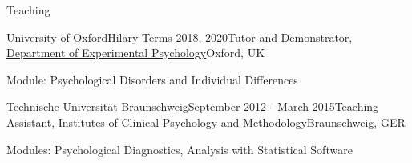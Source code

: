 \documentclass{resume} %
\begin{document}


\begin{rSection}{Teaching}

\begin{rSubsection}{University of Oxford}{Hilary Terms 2018, 2020}{Tutor and Demonstrator, \href{https://www.psy.ox.ac.uk/}{Department of Experimental Psychology}}{Oxford, UK}
  \item Module: Psychological Disorders and Individual Differences
\end{rSubsection}

\begin{rSubsection}{Technische Universit{\"a}t Braunschweig}{September 2012 - March 2015}{Teaching Assistant, Institutes of \href{https://www.tu-braunschweig.de/psychologie/klinische}{Clinical Psychology} and \href{https://www.tu-braunschweig.de/psychologie/methoden}{Methodology}}{Braunschweig, GER}
  \item Modules: Psychological Diagnostics, Analysis with Statistical Software
\end{rSubsection}

\end{rSection}


%
%
%
\end{document}
